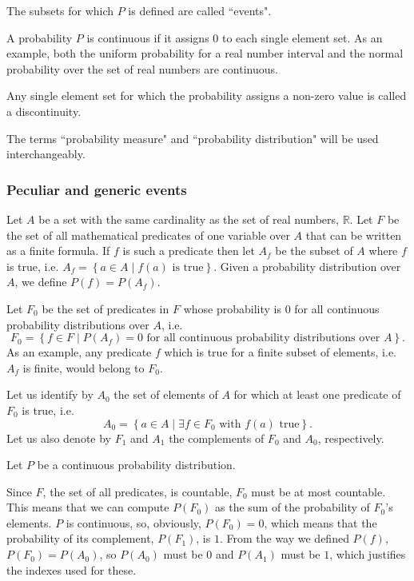 \documentclass[a4paper
,draft
]{article}
\def\reale{\mathbb{R}}
\newcommand{\multime}[1]{\left\{ #1 \right\}}
\newcommand{\ghilimele}[1]{``#1"}
\begin{document}
The subsets for which $P$ is defined are called \ghilimele{events}.

A probability $P$ is continuous if it assigns $0$ to each single element set.
As an example, both the uniform probability for a real number interval and the
normal probability over the set of real numbers are continuous.

Any single element set for which the probability assigns a non-zero value is
called a discontinuity.

The terms \ghilimele{probability measure} and
\ghilimele{probability distribution} will be used interchangeably.

\subsubsection{Peculiar and generic events}

Let $A$ be a set with the same cardinality as the set of real numbers, $\reale$.
Let $F$ be the set of
all mathematical predicates of one variable over $A$ that can be written as a
finite formula.
If $f$ is such a predicate then let $A_f$ be the subset of
$A$ where $f$ is true, i.e. $A_f=\multime{a\in A\mid f(a) \mbox{ is true}}$.
Given a probability distribution over $A$, we define $P(f)=P(A_f)$.

Let $F_0$ be the set of predicates in $F$ whose probability is
$0$ for all continuous probability distributions over $A$, i.e.
$$F_0=\multime{
  f\in F
  \mid P(A_f)=0
    \mbox{ for all continuous probability distributions over } A}.
$$
As an example, any predicate $f$ which is true for a finite subset of elements,
i.e. $A_f$ is finite, would belong to $F_0$.

Let us identify by $A_0$ the
set of elements of $A$ for which at least one predicate of $F_0$ is true, i.e.
$$A_0=\multime{a \in A\mid \exists f\in F_0 \mbox{ with } f(a)\mbox{ true} }.$$
Let us also denote by $F_1$ and $A_1$ the complements of $F_0$ and $A_0$,
respectively.

Let $P$ be a continuous probability distribution.

Since $F$, the set of all predicates, is countable, $F_0$ must be at most
countable.
This means that we can compute
$P(F_0)$ as the sum of the probability of $F_0$'s elements.
$P$ is continuous, so, obviously, $P(F_0)=0$,
which means that the probability of its complement, $P(F_1)$, is $1$.
From the way we defined $P(f)$, $P(F_0) = P(A_0)$, so $P(A_0)$ must be $0$
and $P(A_1)$ must be $1$, which justifies the indexes used for
these.
\end{document}
